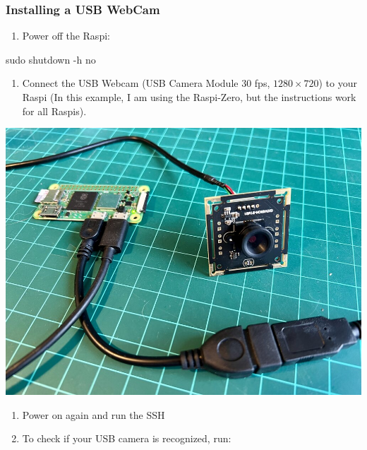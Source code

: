 \documentclass[
]{article}
\newenvironment{Shaded}{\begin{snugshade}}{\end{snugshade}}
\newcommand{\AttributeTok}[1]{\textcolor[rgb]{0.40,0.45,0.13}{#1}}
\newcommand{\FunctionTok}[1]{\textcolor[rgb]{0.28,0.35,0.67}{#1}}
\newcommand{\NormalTok}[1]{\textcolor[rgb]{0.00,0.23,0.31}{#1}}
\providecommand{\tightlist}{%
  \setlength{\itemsep}{0pt}\setlength{\parskip}{0pt}}\usepackage{longtable,booktabs,array}
\begin{document}
\subsubsection{Installing a USB
WebCam}\label{sec-setup-installing-usb-webcam-2569}

\begin{enumerate}
\def\labelenumi{\arabic{enumi}.}
\tightlist
\item
  Power off the Raspi:
\end{enumerate}

\begin{Shaded}
\begin{Highlighting}[]
\FunctionTok{sudo}\NormalTok{ shutdown }\AttributeTok{{-}h}\NormalTok{ no}
\end{Highlighting}
\end{Shaded}

\begin{enumerate}
\def\labelenumi{\arabic{enumi}.}
\setcounter{enumi}{1}
\tightlist
\item
  Connect the USB Webcam (USB Camera Module 30 fps, \(1280\times 720\))
  to your Raspi (In this example, I am using the Raspi-Zero, but the
  instructions work for all Raspis).
\end{enumerate}

\noindent \begin{center}
\includegraphics[width=0.95\linewidth,height=\textheight,keepaspectratio]{images/jpeg/usb-cam-2.jpg}
\end{center}

\begin{enumerate}
\def\labelenumi{\arabic{enumi}.}
\setcounter{enumi}{2}
\tightlist
\item
  Power on again and run the SSH
\item
  To check if your USB camera is recognized, run:
\end{enumerate}
\end{document}
